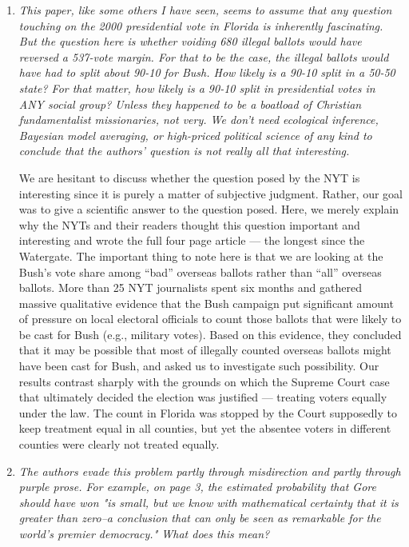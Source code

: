 \documentclass[11pt]{article}
\begin{document}
\begin{enumerate}
\item {\it This paper, like some others I have seen, seems to assume
    that any question touching on the 2000 presidential vote in
    Florida is inherently fascinating.  But the question here is
    whether voiding 680 illegal ballots would have reversed a 537-vote
    margin.  For that to be the case, the illegal ballots would have
    had to split about 90-10 for Bush.  How likely is a 90-10 split in
    a 50-50 state?  For that matter, how likely is a 90-10 split in
    presidential votes in ANY social group?  Unless they happened to
    be a boatload of Christian fundamentalist missionaries, not very.
    We don't need ecological inference, Bayesian model averaging, or
    high-priced political science of any kind to conclude that the
    authors' question is not really all that interesting.}
  
  We are hesitant to discuss whether the question posed by the NYT is
  interesting since it is purely a matter of subjective judgment.
  Rather, our goal was to give a scientific answer to the question
  posed. Here, we merely explain why the NYTs and their readers
  thought this question important and interesting and wrote the full
  four page article --- the longest since the Watergate. The important
  thing to note here is that we are looking at the Bush's vote share
  among ``bad'' overseas ballots rather than ``all'' overseas ballots.
  More than 25 NYT journalists spent six months and gathered massive
  qualitative evidence that the Bush campaign put significant amount
  of pressure on local electoral officials to count those ballots that
  were likely to be cast for Bush (e.g., military votes).  Based on
  this evidence, they concluded that it may be possible that most of
  illegally counted overseas ballots might have been cast for Bush,
  and asked us to investigate such possibility.  Our results contrast
  sharply with the grounds on which the Supreme Court case that
  ultimately decided the election was justified --- treating voters
  equally under the law.  The count in Florida was stopped by the
  Court supposedly to keep treatment equal in all counties, but yet
  the absentee voters in different counties were clearly not treated
  equally.
  
\item {\it The authors evade this problem partly through misdirection
    and partly through purple prose.  For example, on page 3, the
    estimated probability that Gore should have won "is small, but we
    know with mathematical certainty that it is greater than zero--a
    conclusion that can only be seen as remarkable for the world's
    premier democracy."  What does this mean?
    
}
\end{enumerate}
\end{document}
